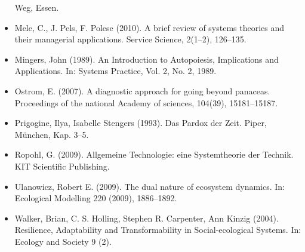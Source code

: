 \documentclass[11pt,a4paper]{article}
\begin{document}
\begin{itemize}
  Weg, Essen.
\item Mele, C., J. Pels, F. Polese (2010). A brief review of systems theories
  and their managerial applications. Service Science, 2(1--2), 126--135.
\item Mingers, John (1989). An Introduction to Autopoiesis, Implications and
  Applications. In: Systems Practice, Vol. 2, No. 2, 1989. 
\item Ostrom, E. (2007). A diagnostic approach for going beyond panaceas.
  Proceedings of the national Academy of sciences, 104(39), 15181--15187.
\item Prigogine, Ilya, Isabelle Stengers (1993). Das Pardox der Zeit. Piper,
  München, Kap. 3--5.  
\item Ropohl, G. (2009). Allgemeine Technologie: eine Systemtheorie der
  Technik.  KIT Scientific Publishing.
\item Ulanowicz, Robert E. (2009). The dual nature of ecosystem dynamics.
  In: Ecological Modelling 220 (2009), 1886–1892. 
\item Walker, Brian, C. S. Holling, Stephen R. Carpenter, Ann Kinzig (2004).
  Resilience, Adaptability and Transformability in Social-ecological Systems. 
  In: Ecology and Society 9 (2).
\end{itemize}
\end{document}
